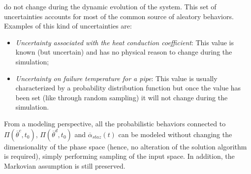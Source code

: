 do not change during the dynamic evolution of the system. This set of uncertainties accounts for most of the 
common source of aleatory behaviors. Examples of this kind of uncertainties are:
\begin{itemize}
  \item \textit{Uncertainty associated with the heat conduction coefficient}:  This value is known (but uncertain) and has no physical reason to change during the simulation;
  \item \textit{Uncertainty on failure temperature for a pipe}: This value is usually characterized by a probability distribution function but once the value has been set (like through random sampling) it will not change during the simulation.
\end{itemize}
From a modeling perspective, all the probabilistic behaviors connected to $\Pi \left ( \overline{\theta}^{c},t_{0} 
\right ) $, $\Pi \left ( \overline{\theta}^{d},t_{0} \right )$ and $\overline{\alpha}_{staz}(t)$ can be modeled without 
changing the dimensionality of the phase space (hence, no alteration of the solution algorithm is required), simply performing sampling of the input space. In addition, the Markovian assumption is still preserved.

